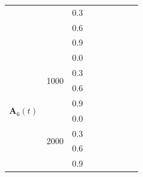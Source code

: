 \begin{table}[htbp]
{\begin{tabular}{lll|cc|cc|cc}
 &  & 0.3 &  &  &  &  &  &  \\
 &  & 0.6 &  &  &  &  &  &  \\
 &  & 0.9 &  &  &  &  &  &  \\
\hline
\multirow{8}{*}{$\mathbf{A}_6(t)$} & \multirow{4}{*}{1000} & 0.0 &  &  &  &  &  &  \\
 &  & 0.3 &  &  &  &  &  &  \\
 &  & 0.6 &  &  &  &  &  &  \\
 &  & 0.9 &  &  &  &  &  &  \\
\cline{2-9}
 & \multirow{4}{*}{2000} & 0.0 &  &  &  &  &  &  \\
 &  & 0.3 &  &  &  &  &  &  \\
 &  & 0.6 &  &  &  &  &  &  \\
 &  & 0.9 &  &  &  &  &  &  \\
\hline
\end{tabular}%
}
\end{table}

